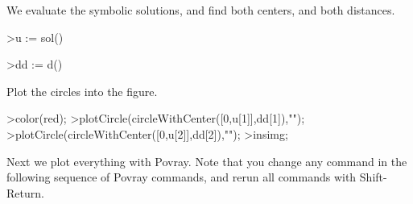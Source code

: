 \documentclass{article}
\begin{document}
\begin{eulernotebook}
\begin{eulercomment}
\begin{eulercomment}
\begin{eulercomment}
\begin{eulercomment}
\begin{eulercomment}
\begin{eulercomment}
\begin{eulercomment}
\begin{eulercomment}
\begin{eulercomment}
We evaluate the symbolic solutions, and find both centers, and both
distances.
\end{eulercomment}
\begin{eulerprompt}
>u := sol()
\end{eulerprompt}
\begin{euleroutput}
  [0.333333,  1]
\end{euleroutput}
\begin{eulerprompt}
>dd := d()
\end{eulerprompt}
\begin{euleroutput}
  [0.149071,  0.447214]
\end{euleroutput}
\begin{eulercomment}
Plot the circles into the figure.
\end{eulercomment}
\begin{eulerprompt}
>color(red);
>plotCircle(circleWithCenter([0,u[1]],dd[1]),"");
>plotCircle(circleWithCenter([0,u[2]],dd[2]),"");
>insimg;
\end{eulerprompt}
\begin{eulercomment}
Next we plot everything with Povray. Note that you change any command in the following
sequence of Povray commands, and rerun all commands with Shift-Return.


\end{eulercomment}
\end{eulercomment}
\end{eulercomment}
\end{eulercomment}
\end{eulercomment}
\end{eulercomment}
\end{eulercomment}
\end{eulercomment}
\end{eulercomment}
\end{eulernotebook}
\end{document}
